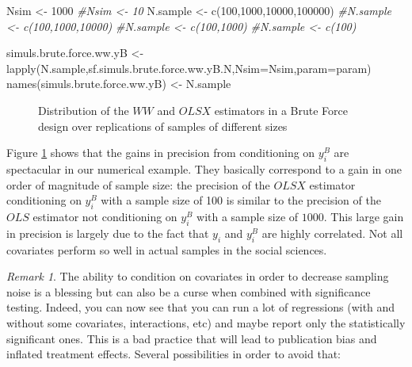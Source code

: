 \documentclass[
]{book}
\newenvironment{Shaded}{\begin{snugshade}}{\end{snugshade}}
\newcommand{\AttributeTok}[1]{\textcolor[rgb]{0.77,0.63,0.00}{#1}}
\newcommand{\CommentTok}[1]{\textcolor[rgb]{0.56,0.35,0.01}{\textit{#1}}}
\newcommand{\DecValTok}[1]{\textcolor[rgb]{0.00,0.00,0.81}{#1}}
\newcommand{\FunctionTok}[1]{\textcolor[rgb]{0.00,0.00,0.00}{#1}}
\newcommand{\NormalTok}[1]{#1}
\newcommand{\OtherTok}[1]{\textcolor[rgb]{0.56,0.35,0.01}{#1}}
\theoremstyle{definition}
\theoremstyle{definition}
\theoremstyle{definition}
\theoremstyle{definition}
\theoremstyle{remark}
\newtheorem*{remark}{Remark}
\begin{document}
\begin{Shaded}
\begin{Highlighting}[]
\NormalTok{Nsim }\OtherTok{\textless{}{-}} \DecValTok{1000}
\CommentTok{\#Nsim \textless{}{-} 10}
\NormalTok{N.sample }\OtherTok{\textless{}{-}} \FunctionTok{c}\NormalTok{(}\DecValTok{100}\NormalTok{,}\DecValTok{1000}\NormalTok{,}\DecValTok{10000}\NormalTok{,}\DecValTok{100000}\NormalTok{)}
\CommentTok{\#N.sample \textless{}{-} c(100,1000,10000)}
\CommentTok{\#N.sample \textless{}{-} c(100,1000)}
\CommentTok{\#N.sample \textless{}{-} c(100)}

\NormalTok{simuls.brute.force.ww.yB }\OtherTok{\textless{}{-}} \FunctionTok{lapply}\NormalTok{(N.sample,sf.simuls.brute.force.ww.yB.N,}\AttributeTok{Nsim=}\NormalTok{Nsim,}\AttributeTok{param=}\NormalTok{param)}
\FunctionTok{names}\NormalTok{(simuls.brute.force.ww.yB) }\OtherTok{\textless{}{-}}\NormalTok{ N.sample}
\end{Highlighting}
\end{Shaded}

\begin{figure}[htbp]

{\centering {}

}

\caption{Distribution of the $WW$ and $OLSX$ estimators in a Brute Force design over replications of samples of different sizes}\label{fig:montecarlohistbruteforcewwyB}
\end{figure}

Figure \ref{fig:montecarlohistbruteforcewwyB} shows that the gains in precision from conditioning on \(y_i^B\) are spectacular in our numerical example.
They basically correspond to a gain in one order of magnitude of sample size: the precision of the \(OLSX\) estimator conditioning on \(y_i^B\) with a sample size of 100 is similar to the precision of the \(OLS\) estimator not conditioning on \(y_i^B\) with a sample size of \(1000\).
This large gain in precision is largely due to the fact that \(y_i\) and \(y_i^B\) are highly correlated.
Not all covariates perform so well in actual samples in the social sciences.

\begin{remark}
\iffalse{} {Remark. } \fi{}The ability to condition on covariates in order to decrease sampling noise is a blessing but can also be a curse when combined with significance testing.
Indeed, you can now see that you can run a lot of regressions (with and without some covariates, interactions, etc) and maybe report only the statistically significant ones.
This is a bad practice that will lead to publication bias and inflated treatment effects.
Several possibilities in order to avoid that:
\end{remark}
\end{document}
